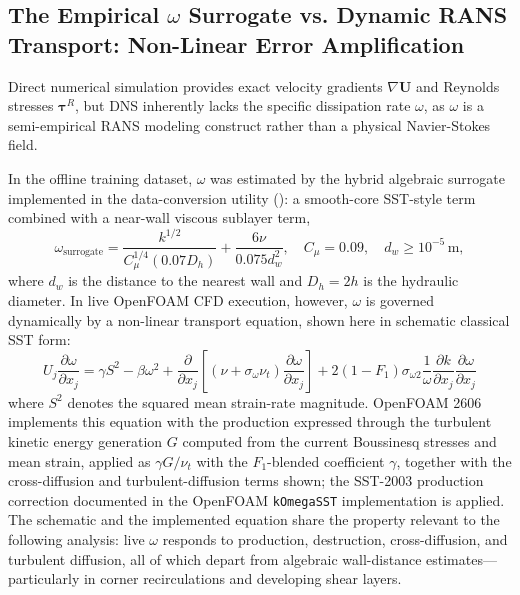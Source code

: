 \documentclass[11pt,a4paper]{article}
\begin{document}
\subsection{The Empirical \texorpdfstring{$\omega$}{omega} Surrogate vs. Dynamic RANS Transport: Non-Linear Error Amplification}
Direct numerical simulation provides exact velocity gradients $\nabla \mathbf{U}$ and Reynolds stresses $\boldsymbol{\tau}^R$, but DNS inherently lacks the specific dissipation rate $\omega$, as $\omega$ is a semi-empirical RANS modeling construct rather than a physical Navier-Stokes field.

In the offline training dataset, $\omega$ was estimated by the hybrid algebraic surrogate implemented in the data-conversion utility (): a smooth-core SST-style term combined with a near-wall viscous sublayer term,
\begin{equation}
\omega_{\text{surrogate}} = \frac{k^{1/2}}{C_\mu^{1/4} (0.07 D_h)} + \frac{6\nu}{0.075 d_w^2}, \quad C_\mu = 0.09, \quad d_w \ge 10^{-5}\,\text{m},
\end{equation}
where $d_w$ is the distance to the nearest wall and $D_h = 2h$ is the hydraulic diameter.
In live OpenFOAM CFD execution, however, $\omega$ is governed dynamically by a non-linear transport equation, shown here in schematic classical SST form:
\begin{equation}
U_j \frac{\partial \omega}{\partial x_j} = \gamma S^2 - \beta \omega^2 + \frac{\partial}{\partial x_j}\left[(\nu + \sigma_\omega \nu_t)\frac{\partial \omega}{\partial x_j}\right] + 2(1 - F_1)\sigma_{\omega 2}\frac{1}{\omega}\frac{\partial k}{\partial x_j}\frac{\partial \omega}{\partial x_j}
\end{equation}
where $S^2$ denotes the squared mean strain-rate magnitude. OpenFOAM 2606 implements this equation with the production expressed through the turbulent kinetic energy generation $G$ computed from the current Boussinesq stresses and mean strain, applied as $\gamma G/\nu_t$ with the $F_1$-blended coefficient $\gamma$, together with the cross-diffusion and turbulent-diffusion terms shown; the SST-2003 production correction documented in the OpenFOAM \texttt{kOmegaSST} implementation is applied. The schematic and the implemented equation share the property relevant to the following analysis: live $\omega$ responds to production, destruction, cross-diffusion, and turbulent diffusion, all of which depart from algebraic wall-distance estimates---particularly in corner recirculations and developing shear layers.
\end{document}
